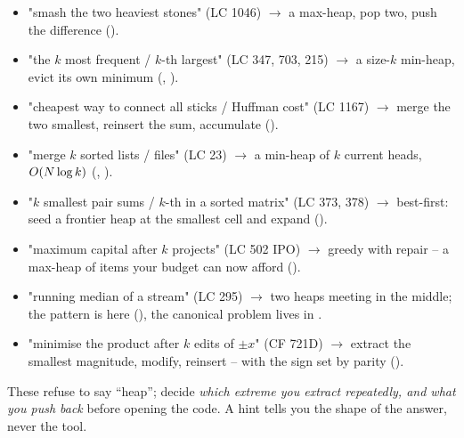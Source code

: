 \begin{itemize}[nosep, leftmargin=1.4em]
  \item "smash the two heaviest stones" (LC 1046) $\longrightarrow$ a max-heap, pop two, push the difference
        ().
  \item "the $k$ most frequent / $k$-th largest" (LC 347, 703, 215) $\longrightarrow$ a size-$k$ min-heap,
        evict its own minimum (, ).
  \item "cheapest way to connect all sticks / Huffman cost" (LC 1167) $\longrightarrow$ merge the two
        smallest, reinsert the sum, accumulate ().
  \item "merge $k$ sorted lists / files" (LC 23) $\longrightarrow$ a min-heap of $k$ current heads,
        $O(N\log k)$ (, ).
  \item "$k$ smallest pair sums / $k$-th in a sorted matrix" (LC 373, 378) $\longrightarrow$ best-first:
        seed a frontier heap at the smallest cell and expand ().
  \item "maximum capital after $k$ projects" (LC 502 IPO) $\longrightarrow$ greedy with repair -- a
        max-heap of items your budget can now afford ().
  \item "running median of a stream" (LC 295) $\longrightarrow$ two heaps meeting in the middle; the pattern
        is here (), the canonical problem lives in .
  \item "minimise the product after $k$ edits of $\pm x$" (CF 721D) $\longrightarrow$ extract the smallest
        magnitude, modify, reinsert -- with the sign set by parity ().
\end{itemize}


These refuse to say ``heap''; decide \emph{which extreme you extract repeatedly, and what you push back}
before opening the code. A hint tells you the shape of the answer, never the tool.

